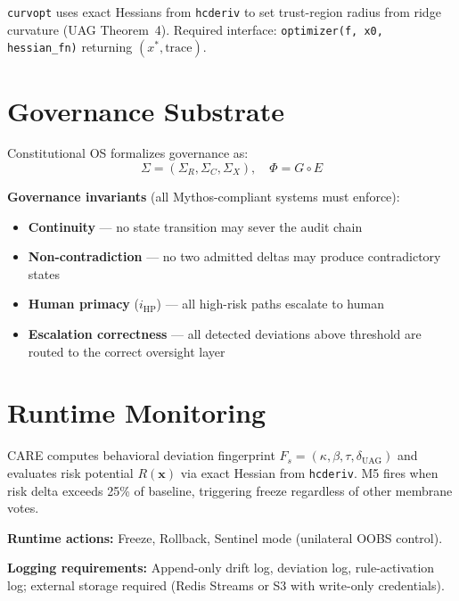 \documentclass[11pt]{article}
\begin{document}
\texttt{curvopt} uses exact Hessians from \texttt{hcderiv} to set trust-region radius from
ridge curvature (UAG Theorem~4). Required interface: \texttt{optimizer(f, x0, hessian\_fn)}
returning $(x^*, \mathrm{trace})$.


\section{Governance Substrate}

Constitutional OS formalizes governance as:
\[
\Sigma = (\Sigma_R, \Sigma_C, \Sigma_X), \quad \Phi = G \circ E
\]

\noindent \textbf{Governance invariants} (all Mythos-compliant systems must enforce):
\begin{itemize}[noitemsep]
\item \textbf{Continuity} --- no state transition may sever the audit chain
\item \textbf{Non-contradiction} --- no two admitted deltas may produce contradictory states
\item \textbf{Human primacy} ($i_{\mathrm{HP}}$) --- all high-risk paths escalate to human
\item \textbf{Escalation correctness} --- all detected deviations above threshold are routed
      to the correct oversight layer
\end{itemize}


\section{Runtime Monitoring}

CARE computes behavioral deviation fingerprint $F_s = (\kappa, \beta, \tau, \delta_{\mathrm{UAG}})$
and evaluates risk potential $R(\mathbf{x})$ via exact Hessian from \texttt{hcderiv}. M5 fires
when risk delta exceeds 25\% of baseline, triggering freeze regardless of other membrane votes.

\noindent \textbf{Runtime actions:} Freeze, Rollback, Sentinel mode (unilateral OOBS control).

\noindent \textbf{Logging requirements:} Append-only drift log, deviation log,
rule-activation log; external storage required (Redis Streams or S3 with write-only credentials).
\end{document}
